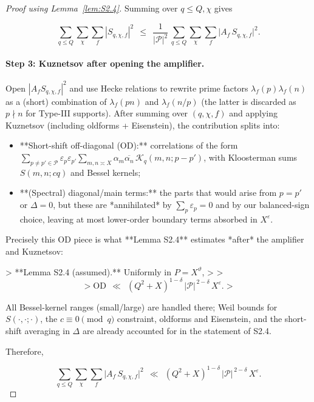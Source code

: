 \documentclass[11pt]{article}
\theoremstyle{definition}
\theoremstyle{remark}
\begin{document}
\begin{proof}[Proof using Lemma~\ref{lem:S2.4}]
	Summing over $q\le Q,\chi$ gives

	\begin{equation}
		\sum_{q\le Q}\sum_{\chi}\sum_f |S_{q,\chi,f}|^2
		\ \ \le\ \ \frac{1}{|\mathcal P|^2}\,
		\sum_{q\le Q}\sum_{\chi}\sum_f \big|A_f\,S_{q,\chi,f}\big|^2.
		\tag{3.1}
	\end{equation}

	\paragraph{Step 3: Kuznetsov after opening the amplifier.}
	Open $|A_f S_{q,\chi,f}|^2$ and use Hecke relations to rewrite prime factors $\lambda_f(p)\lambda_f(n)$ as a (short) combination of $\lambda_f(pn)$ and $\lambda_f(n/p)$ (the latter is discarded as $p\nmid n$ for Type-III supports). After summing over $(q,\chi,f)$ and applying Kuznetsov (including oldforms + Eisenstein), the contribution splits into:

	\begin{itemize}
		\item **Short-shift off-diagonal (OD):** correlations of the form
		      $\sum_{p\neq p'\in\mathcal P}\varepsilon_p\varepsilon_{p'}\sum_{m,n\asymp X}\alpha_m\overline{\alpha_n}\, \mathcal{K}_{q}(m, n; p-p')$,
		      with Kloosterman sums $S(m,n;cq)$ and Bessel kernels;
		\item **(Spectral) diagonal/main terms:** the parts that would arise from $p=p'$ or $\Delta=0$, but these are *annihilated* by $\sum_p\varepsilon_p=0$ and by our balanced-sign choice, leaving at most lower-order boundary terms absorbed in $X^{\varepsilon}$.
	\end{itemize}

	Precisely this OD piece is what **Lemma S2.4** estimates *after* the amplifier and Kuznetsov:

	> **Lemma S2.4 (assumed).** Uniformly in $P=X^\vartheta$,
	>
	> $$
		> \mathrm{OD}\ \ \ll\ \ (Q^2+X)^{1-\delta}\,|\mathcal P|^{\,2-\delta}\,X^{\varepsilon}.
		> $$

	All Bessel-kernel ranges (small/large) are handled there; Weil bounds for $S(\cdot,\cdot;\cdot)$, the $c\equiv0\pmod q$ constraint, oldforms and Eisenstein, and the short-shift averaging in $\Delta$ are already accounted for in the statement of S2.4.

	Therefore,

	\begin{equation}
		\sum_{q\le Q}\sum_{\chi}\sum_f \big|A_f\,S_{q,\chi,f}\big|^2
		\ \ \ll\ \ (Q^2+X)^{1-\delta}\,|\mathcal P|^{\,2-\delta}\,X^{\varepsilon}.
		\tag{3.2}
	\end{equation}



\end{proof}
\end{document}
